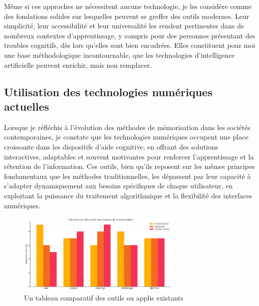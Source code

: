 \documentclass[11pt,a4paper]{report}
\begin{document}
Même si ces approches ne nécessitent aucune technologie, je les considère comme des fondations solides sur lesquelles peuvent se greffer des outils modernes. Leur simplicité, leur accessibilité et leur universalité les rendent pertinentes dans de nombreux contextes d’apprentissage, y compris pour des personnes présentant des troubles cognitifs, dès lors qu’elles sont bien encadrées. Elles constituent pour moi une base méthodologique incontournable, que les technologies d’intelligence artificielle peuvent enrichir, mais non remplacer.

\subsection{Utilisation des technologies numériques actuelles}

Lorsque je réfléchis à l’évolution des méthodes de mémorisation dans les sociétés contemporaines, je constate que les technologies numériques occupent une place croissante dans les dispositifs d’aide cognitive, en offrant des solutions interactives, adaptables et souvent motivantes pour renforcer l’apprentissage et la rétention de l’information. Ces outils, bien qu’ils reposent sur les mêmes principes fondamentaux que les méthodes traditionnelles, les dépassent par leur capacité à s’adapter dynamiquement aux besoins spécifiques de chaque utilisateur, en exploitant la puissance du traitement algorithmique et la flexibilité des interfaces numériques.

\begin{figure}[h]
    \centering
    \includegraphics[width=0.7\textwidth]{images/1.3.2.png}
    \caption{Un tableau comparatif des outils ou applis existants}
    \label{fig:1.3.2}
\end{figure}
\end{document}
